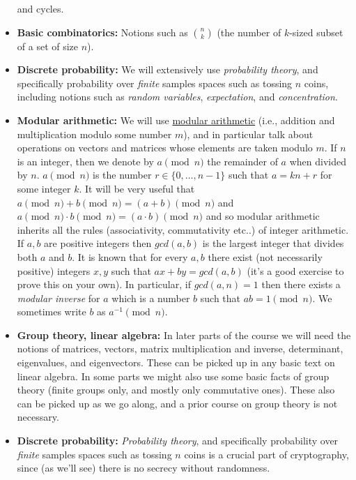 \begin{itemize}
  and cycles.
\item
  \textbf{Basic combinatorics:} Notions such as \(\binom{n}{k}\) (the
  number of \(k\)-sized subset of a set of size \(n\)).
\item
  \textbf{Discrete probability:} We will extensively use
  \emph{probability theory}, and specifically probability over
  \emph{finite} samples spaces such as tossing \(n\) coins, including
  notions such as \emph{random variables}, \emph{expectation}, and
  \emph{concentration}.
\item
  \textbf{Modular arithmetic:} We will use
  \href{https://en.wikipedia.org/wiki/Modular_arithmetic}{modular
  arithmetic} (i.e., addition and multiplication modulo some number
  \(m\)), and in particular talk about operations on vectors and
  matrices whose elements are taken modulo \(m\). If \(n\) is an
  integer, then we denote by \(a \pmod{n}\) the remainder of \(a\) when
  divided by \(n\). \(a\pmod{n}\) is the number \(r\in\{0,\ldots,n-1\}\)
  such that \(a = kn+r\) for some integer \(k\). It will be very useful
  that \(a\pmod{n} + b \pmod{n} = (a+b) \pmod{n}\) and
  \(a\pmod{n} \cdot b \pmod{n} = (a\cdot b) \pmod{n}\) and so modular
  arithmetic inherits all the rules (associativity, commutativity etc..)
  of integer arithmetic. If \(a,b\) are positive integers then
  \(gcd(a,b)\) is the largest integer that divides both \(a\) and \(b\).
  It is known that for every \(a,b\) there exist (not necessarily
  positive) integers \(x,y\) such that \(ax + by = gcd(a,b)\) (it's a
  good exercise to prove this on your own). In particular, if
  \(gcd(a,n)=1\) then there exists a \emph{modular inverse} for \(a\)
  which is a number \(b\) such that \(ab = 1 \pmod{n}\). We sometimes
  write \(b\) as \(a^{-1} \pmod{n}\).
\item
  \textbf{Group theory, linear algebra:} In later parts of the course we
  will need the notions of matrices, vectors, matrix multiplication and
  inverse, determinant, eigenvalues, and eigenvectors. These can be
  picked up in any basic text on linear algebra. In some parts we might
  also use some basic facts of group theory (finite groups only, and
  mostly only commutative ones). These also can be picked up as we go
  along, and a prior course on group theory is not necessary.
\item
  \textbf{Discrete probability:} \emph{Probability theory}, and
  specifically probability over \emph{finite} samples spaces such as
  tossing \(n\) coins is a crucial part of cryptography, since (as we'll
  see) there is no secrecy without randomness.
\end{itemize}

